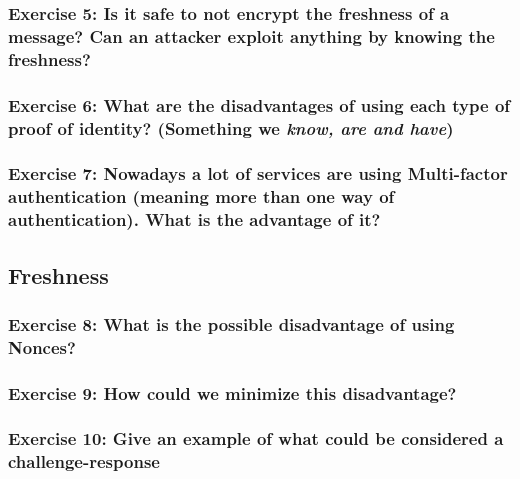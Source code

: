 \documentclass[12pt,a4paper]{article}
\theoremstyle{definition}
\begin{document}
\subsubsection*{Exercise 5: Is it safe to not encrypt the freshness of a message? Can an attacker exploit anything by knowing the freshness? }

\subsubsection*{Exercise 6: What are the disadvantages of using each type of proof of identity? (Something we \emph{know, are and have})}

\subsubsection*{Exercise 7: Nowadays a lot of services are using Multi-factor authentication (meaning more than one way of authentication). What is the advantage of it?}

\subsection*{Freshness}
\subsubsection*{Exercise 8: What is the possible disadvantage of using Nonces?}

\subsubsection*{Exercise 9: How could we minimize this disadvantage?}

\subsubsection*{Exercise 10: Give an example of what could be considered a challenge-response}



\end{document}
